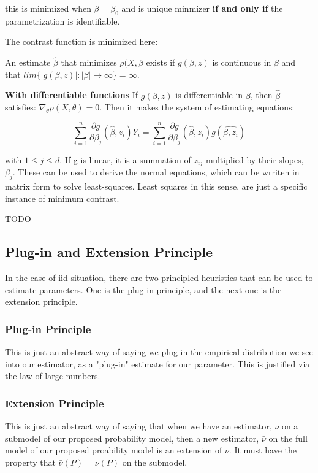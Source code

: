 				this is minimized when $\beta = \beta_0$ and is unique minmizer \textbf{if and only if} the parametrization is identifiable. 

				The contrast function is minimized here:

				An estimate $\hat{\beta}$ that minimizes $\rho(X, \beta$ exists if $g(\beta, z)$ is continuous in $\beta$ and that $lim\{|g(\beta, z)| : |\beta| \rightarrow \infty \} = \infty$.

				\textbf{With differentiable functions}
				If $g(\beta, z)$ is differentiable in $\beta$, then $\hat{\beta}$ satisfies: $\nabla_\theta \rho(X, \theta) = 0$. Then it makes the system of estimating equations:

					$$\sum_{i=1}^n \frac{\partial g}{\partial \beta_j} (\hat{\beta}, z_i) Y_i = \sum_{i=1}^n \frac{\partial g}{\partial \beta_j} (\hat{\beta}, z_i) g(\hat{\beta, z_i})$$

				with $1 \le j \le d$. If g is linear, it is a summation of $z_{ij}$ multiplied by their slopes, $\beta_j$. These can be used to derive the normal equations, which can be wrriten in matrix form to solve least-squares. Least squares in this sense, are just a specific instance of minimum contrast.

				TODO

	\subsection{Plug-in and Extension Principle}
		In the case of iid situation, there are two principled heuristics that can be used to estimate parameters. One is the plug-in principle, and the next one is the extension principle.

		\subsubsection{Plug-in Principle}

			This is just an abstract way of saying we plug in the empirical distribution we see into our estimator, as a "plug-in" estimate for our parameter. This is justified via the law of large numbers.

		\subsubsection{Extension Principle}

			This is just an abstract way of saying that when we have an estimator, $\nu$ on a submodel of our proposed probability model, then a new estimator, $\bar{\nu}$ on the full model of our proposed proability model is an extension of $\nu$. It must have the property that $\bar{\nu}(P) = \nu(P)$ on the submodel. 

